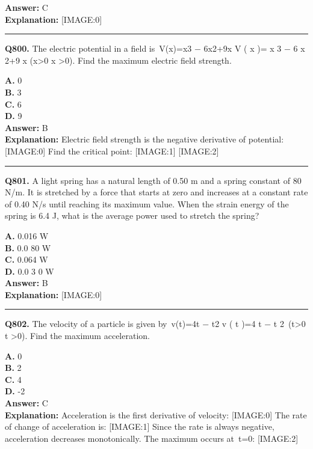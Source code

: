 \documentclass[12pt]{article}
\begin{document}
\textbf{Answer:} C \\
\textbf{Explanation:} [IMAGE:0]

\hrule
\vspace{1em}


\noindent
\textbf{Q800.} The electric potential in a field is V(x)=x3
−
6x2+9x
V
(
x
)=
x
3
−
6
x
2+9
x
(x>0
x
>0). Find the maximum electric field strength.



\textbf{A.} 0 \\
\textbf{B.} 3 \\
\textbf{C.} 6 \\
\textbf{D.} 9 \\

\textbf{Answer:} B \\
\textbf{Explanation:} Electric field strength is the negative derivative of potential:
[IMAGE:0]
Find the critical point:
[IMAGE:1]
[IMAGE:2]

\hrule
\vspace{1em}


\noindent
\textbf{Q801.} A light spring has a natural length of 0.50 m and a spring constant of 80 N/m. It is stretched by a force that starts at zero and increases at a constant rate of 0.40 N/s until reaching its maximum value. When the strain energy of the spring is
6.4
J, what is the average power used to stretch the spring?



\textbf{A.} 0.016 W \\
\textbf{B.} 0.0
80
W \\
\textbf{C.} 0.064 W \\
\textbf{D.} 0.0
3
0 W \\

\textbf{Answer:} B \\
\textbf{Explanation:} [IMAGE:0]

\hrule
\vspace{1em}


\noindent
\textbf{Q802.} The velocity of a particle is given by v(t)=4t
−
t2
v
(
t
)=4
t
−
t
2 (t>0
t
>0). Find the maximum acceleration.



\textbf{A.} 0 \\
\textbf{B.} 2 \\
\textbf{C.} 4 \\
\textbf{D.} -2 \\

\textbf{Answer:} C \\
\textbf{Explanation:} Acceleration is the first derivative of velocity:
[IMAGE:0]
The rate of change of acceleration is:
[IMAGE:1]
Since the rate is always negative, acceleration decreases monotonically. The maximum occurs at t=0:
[IMAGE:2]
\end{document}
